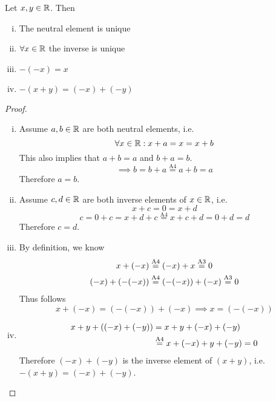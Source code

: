 \documentclass[../../script.tex]{subfiles}
\begin{document}
\begin{thm}\label{thm:addition}
	Let $x, y \in \mathbb{R}$. Then

	\begin{enumerate}[(i)]
		\item The neutral element is unique
		\item $\forall x \in \mathbb{R}$ the inverse is unique
		\item $-(-x) = x$
		\item $-(x + y) = (-x) + (-y)$
	\end{enumerate}
\end{thm}
\begin{proof}\leavevmode
	\begin{enumerate}[(i)]
		\item Assume $a, b \in \mathbb{R}$ are both neutral elements, i.e.
		\begin{equation}
			\forall x \in \mathbb{R}: x + a = x = x + b
		\end{equation}
		This also implies that $a + b = a$ and $b + a = b$.
		\begin{equation}
			\implies b = b + a \stackrel{\text{A4}}{=} a + b = a
		\end{equation}
		Therefore $a = b$.
		
		\item Assume $c, d \in \mathbb{R}$ are both inverse elements of $x \in \mathbb{R}$, i.e.
		\begin{equation}
			x + c = 0 = x + d
		\end{equation}
		\begin{equation}
			c = 0 + c = x + d + c \stackrel{\text{A4}}{=} x + c + d = 0 + d = d
		\end{equation}
		Therefore $c = d$.
		
		\item By definition, we know 
		\begin{align}
			x + (-x) &\stackrel{\text{\text{A4}}}{=} (-x) + x \stackrel{\text{\text{A3}}}{=} 0 \\
			(-x) + (-(-x)) &\stackrel{\text{\text{A4}}}{=} (-(-x)) + (-x) \stackrel{\text{\text{A3}}}{=} 0
		\end{align}
		Thus follows 
		\begin{equation}
			x + (-x) = (-(-x)) + (-x) \implies x = (-(-x))
		\end{equation}
		
		\item
		\begin{equation}
		\begin{split}
			x + y + ((-x) + (-y)) &= x + y + (-x) + (-y) \\ 
			&\stackrel{\text{A4}}{=} x + (-x) + y + (-y) = 0
		\end{split}
		\end{equation}
		Therefore $(-x) + (-y)$ is the inverse element of $(x+y)$, i.e. $-(x + y) = (-x) + (-y)$.
	\end{enumerate}
\end{proof}
\end{document}
